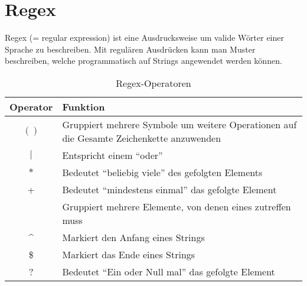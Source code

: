 \documentclass{article}
\begin{document}
\newpage
\section{Regex}
Regex (= regular expression) ist eine Ausdrucksweise um valide Wörter einer Sprache zu beschreiben. Mit regulären Ausdrücken kann man Muster beschreiben, welche programmatisch auf Strings angewendet werden können. 

\begin{table}[h!]
		\begin{center}
				\caption{Regex-Operatoren}
				\label{tab:Regexoperationen}
				\begin{tabular}{|c|p{8cm}|}
						\hline
						\textbf{Operator} & \textbf{Funktion} \\
						\hline
						$()$ & Gruppiert mehrere Symbole um weitere Operationen auf die Gesamte Zeichenkette anzuwenden\\
						\hline
						$|$ & Entspricht einem ``oder''\\
						\hline
						$*$ & Bedeutet ``beliebig viele'' des gefolgten Elements\\
						\hline
						+ & Bedeutet ``mindestens einmal'' das gefolgte Element\\
						\hline
						[ ] & Gruppiert mehrere Elemente, von denen eines zutreffen muss\\
						\hline
						\textasciicircum & Markiert den Anfang eines Strings\\
						\hline
						\$ & Markiert das Ende eines Strings\\
						\hline
						? & Bedeutet ``Ein oder Null mal'' das gefolgte Element\\
						\hline
				\end{tabular}
		\end{center}
\end{table}
\end{document}
